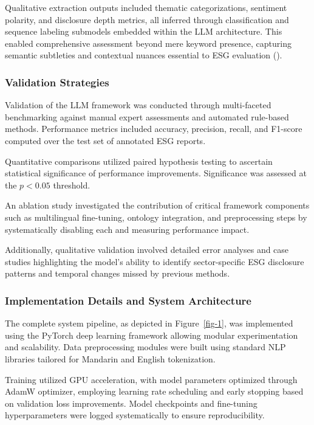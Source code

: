 \documentclass[
  12pt,
]{article}
\begin{document}
Qualitative extraction outputs included thematic categorizations,
sentiment polarity, and disclosure depth metrics, all inferred through
classification and sequence labeling submodels embedded within the LLM
architecture. This enabled comprehensive assessment beyond mere keyword
presence, capturing semantic subtleties and contextual nuances essential
to ESG evaluation ().

\subsubsection{Validation Strategies}\label{validation-strategies}

Validation of the LLM framework was conducted through multi-faceted
benchmarking against manual expert assessments and automated rule-based
methods. Performance metrics included accuracy, precision, recall, and
F1-score computed over the test set of annotated ESG reports.

Quantitative comparisons utilized paired hypothesis testing to ascertain
statistical significance of performance improvements. Significance was
assessed at the \(p<0.05\) threshold.

An ablation study investigated the contribution of critical framework
components such as multilingual fine-tuning, ontology integration, and
preprocessing steps by systematically disabling each and measuring
performance impact.

Additionally, qualitative validation involved detailed error analyses
and case studies highlighting the model's ability to identify
sector-specific ESG disclosure patterns and temporal changes missed by
previous methods.

\subsubsection{Implementation Details and System
Architecture}\label{implementation-details-and-system-architecture}

The complete system pipeline, as depicted in Figure~\ref{fig-1}, was
implemented using the PyTorch deep learning framework allowing modular
experimentation and scalability. Data preprocessing modules were built
using standard NLP libraries tailored for Mandarin and English
tokenization.

Training utilized GPU acceleration, with model parameters optimized
through AdamW optimizer, employing learning rate scheduling and early
stopping based on validation loss improvements. Model checkpoints and
fine-tuning hyperparameters were logged systematically to ensure
reproducibility.
\end{document}
